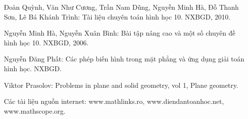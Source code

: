 \begin{thebibliography}{99}
	
	\bibitem{[1]} Đoàn Quỳnh, Văn Như Cương, Trần Nam Dũng, Nguyễn Minh Hà, Đỗ Thanh Sơn, Lê Bá Khánh Trình: Tài liệu chuyên toán hình học 10. NXBGD, 2010.
	
	\bibitem{[2]} Nguyễn Minh Hà, Nguyễn Xuân Bình: Bài tập nâng cao và một số chuyên đề hình học 10. NXBGD, 2006.
	
	\bibitem{[3]} Nguyễn Đăng Phất: Các phép biến hình trong mặt phẳng và ứng dụng giải toán hình học. NXBGD.
	
	\bibitem{[4]} Viktor Prasolov: Problems in plane and solid geometry, vol 1, Plane geometry.
	
	\bibitem{[5]} Các tài liệu nguồn internet: www.mathlinks.ro, www.diendantoanhoc.net, www.mathscope.org.
\end{thebibliography}

